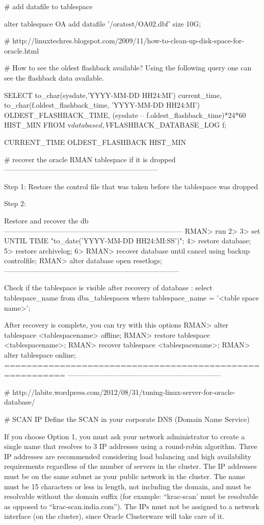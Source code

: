 \begin{table}
# add datafile to tablespace

alter tablespace OA add datafile '/oratest/OA02.dbf' size 10G;

# http://linuxtechres.blogspot.com/2009/11/how-to-clean-up-disk-space-for-oracle.html

# How to see the oldest flashback available?
Using the following query one can see the flashback data available.

SELECT to_char(sysdate,'YYYY-MM-DD HH24:MI') current_time, to_char(f.oldest_flashback_time, 'YYYY-MM-DD HH24:MI') OLDEST_FLASHBACK_TIME,
(sysdate – f.oldest_flashback_time)*24*60 HIST_MIN FROM v$database d, V$FLASHBACK_DATABASE_LOG f;

CURRENT_TIME OLDEST_FLASHBACK HIST_MIN


#  recover the oracle RMAN tablespace if it is dropped
-----------------------------------------------------------------

Step 1:
Restore the control file that was taken before the tablespace was dropped
 

Step 2:

Restore and recover the db
---------------------------------------------------------------------------
RMAN> run
2> {
3> set UNTIL TIME "to_date('YYYY-MM-DD HH24:MI:SS')";
4> restore database;
5> restore archivelog;
6> }
RMAN> recover database until cancel using backup controlfile;
RMAN> alter database open resetlogs;
--------------------------------------------------------------------------

Check if the tablespace is visible after recovery of database :
select tablespace_name from dba_tablespaces where tablespace_name = '<table space name>';
 

After recovery is complete, you can try with this options
RMAN> alter tablespace <tablespacename> offline;
RMAN> restore tablespace <tablespacename>;
RMAN> recover tablespace  <tablespacename>;
RMAN> alter tablespace online;
=========================================================
-----------------------------------------------------------------

# http://labite.wordpress.com/2012/08/31/tuning-linux-server-for-oracle-database/


# SCAN IP 
 Define the SCAN in your corporate DNS (Domain Name Service)

 If you choose Option 1, you must ask your network administrator to create a single name that resolves to 3 IP addresses using a round-robin algorithm. Three IP addresses are recommended considering load balancing and high availability requirements regardless of the number of servers in the cluster. The IP addresses must be on the same subnet as your public network in the cluster. The name must be 15 characters or less in length, not including the domain, and must be resolvable without the domain suffix (for example: “krac-scan’ must be resolvable as opposed to “krac-scan.india.com”). The IPs must not be assigned to a network interface (on the cluster), since Oracle Clusterware will take care of it.


\end{table}
